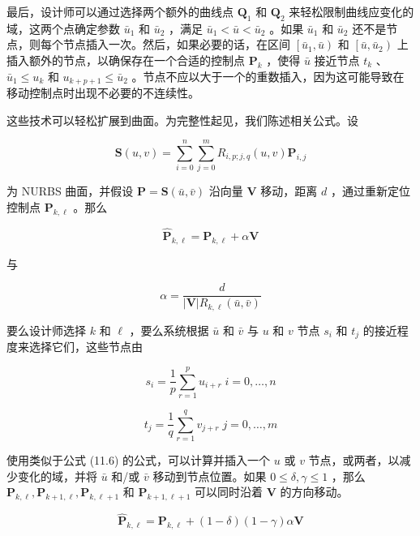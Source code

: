 \documentclass[../main.tex]{subfiles}
\begin{document}
最后，设计师可以通过选择两个额外的曲线点 \({\mathbf{Q}}_{1}\) 和 \({\mathbf{Q}}_{2}\) 来轻松限制曲线应变化的域，这两个点确定参数 \({\bar{u}}_{1}\) 和 \({\bar{u}}_{2}\) ，满足 \({\bar{u}}_{1} < \bar{u} < {\bar{u}}_{2}\) 。如果 \({\bar{u}}_{1}\) 和 \({\bar{u}}_{2}\) 还不是节点，则每个节点插入一次。然后，如果必要的话，在区间 \(\left\lbrack  {{\bar{u}}_{1},\bar{u}}\right)\) 和 \(\left\lbrack  {\bar{u},{\bar{u}}_{2}}\right)\) 上插入额外的节点，以确保存在一个合适的控制点 \({\mathbf{P}}_{k}\) ，使得 \(\bar{u}\) 接近节点 \({t}_{k}\) 、 \({\bar{u}}_{1} \leq  {u}_{k}\) 和 \({u}_{k + p + 1} \leq  {\bar{u}}_{2}\) 。节点不应以大于一个的重数插入，因为这可能导致在移动控制点时出现不必要的不连续性。

这些技术可以轻松扩展到曲面。为完整性起见，我们陈述相关公式。设

\[
\mathbf{S}\left( {u,v}\right)  = \mathop{\sum }\limits_{{i = 0}}^{n}\mathop{\sum }\limits_{{j = 0}}^{m}{R}_{i,p;j,q}\left( {u,v}\right) {\mathbf{P}}_{i,j}
\]

为 NURBS 曲面，并假设 \(\mathbf{P} = \mathbf{S}\left( {\bar{u},\bar{v}}\right)\) 沿向量 \(\mathbf{V}\) 移动，距离 \(d\) ，通过重新定位控制点 \({\mathbf{P}}_{k,\ell }\) 。那么

\[
{\widehat{\mathbf{P}}}_{k,\ell } = {\mathbf{P}}_{k,\ell } + \alpha \mathbf{V} \tag{11.10}
\]

与

\[
\alpha  = \frac{d}{\left| \mathbf{V}\right| {R}_{k,\ell }\left( {\bar{u},\bar{v}}\right) } \tag{11.11}
\]

要么设计师选择 \(k\) 和 \(\ell\) ，要么系统根据 \(\bar{u}\) 和 \(\bar{v}\) 与 \(u\) 和 \(v\) 节点 \({s}_{i}\) 和 \({t}_{j}\) 的接近程度来选择它们，这些节点由

\[
{s}_{i} = \frac{1}{p}\mathop{\sum }\limits_{{r = 1}}^{p}{u}_{i + r}\;i = 0,\ldots ,n
\]

\[
{t}_{j} = \frac{1}{q}\mathop{\sum }\limits_{{r = 1}}^{q}{v}_{j + r}\;j = 0,\ldots ,m \tag{11.12}
\]

使用类似于公式 (11.6) 的公式，可以计算并插入一个 \(u\) 或 \(v\) 节点，或两者，以减少变化的域，并将 \(\bar{u}\) 和/或 \(\bar{v}\) 移动到节点位置。如果 \(0 \leq  \delta ,\gamma  \leq  1\) ，那么 \({\mathbf{P}}_{k,\ell },{\mathbf{P}}_{k + 1,\ell },{\mathbf{P}}_{k,\ell  + 1}\) 和 \({\mathbf{P}}_{k + 1,\ell  + 1}\) 可以同时沿着 \(\mathbf{V}\) 的方向移动。

\[
{\widehat{\mathbf{P}}}_{k,\ell } = {\mathbf{P}}_{k,\ell } + \left( {1 - \delta }\right) \left( {1 - \gamma }\right) \alpha \mathbf{V}
\]
\end{document}
